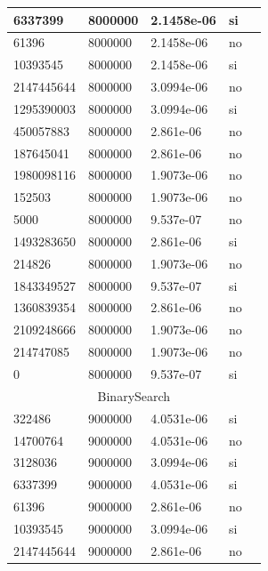 \documentclass[12pt, fleqn]{article}                             %
\theoremstyle{break}                                            %
\begin{document}
\begin{longtable}{|m{5em}|m{5em}|m{10em}|m{5em}|@{}m{0pt}@{}}
            6337399& 8000000  & 2.1458e-06 & si &\\[1em]    \hline
            61396& 8000000  & 2.1458e-06 & no &\\[1em]    \hline
            10393545& 8000000  & 2.1458e-06 & si &\\[1em]    \hline
            2147445644& 8000000  & 3.0994e-06 & no &\\[1em]    \hline
            1295390003& 8000000  & 3.0994e-06 & si &\\[1em]    \hline
            450057883& 8000000  & 2.861e-06 & no &\\[1em]    \hline
            187645041& 8000000  & 2.861e-06 & no &\\[1em]    \hline
            1980098116& 8000000  & 1.9073e-06 & no &\\[1em]    \hline
            152503& 8000000  & 1.9073e-06 & no &\\[1em]    \hline
            5000& 8000000  & 9.537e-07 & no &\\[1em]    \hline
            1493283650& 8000000  & 2.861e-06 & si &\\[1em]    \hline
            214826& 8000000  & 1.9073e-06 & no &\\[1em]    \hline
            1843349527& 8000000  & 9.537e-07 & si &\\[1em]    \hline
            1360839354& 8000000  & 2.861e-06 & no &\\[1em]    \hline
            2109248666& 8000000  & 1.9073e-06 & no &\\[1em]    \hline
            214747085& 8000000  & 1.9073e-06 & no &\\[1em]    \hline
            0& 8000000  & 9.537e-07 & si &\\[1em]    \hline
            \multicolumn{5}{|c|}{BinarySearch}   \\          \hline
            322486& 9000000  & 4.0531e-06 & si &\\[1em]    \hline
            14700764& 9000000  & 4.0531e-06 & no &\\[1em]    \hline
            3128036& 9000000  & 3.0994e-06 & si &\\[1em]    \hline
            6337399& 9000000  & 4.0531e-06 & si &\\[1em]    \hline
            61396& 9000000  & 2.861e-06 & no &\\[1em]    \hline
            10393545& 9000000  & 3.0994e-06 & si &\\[1em]    \hline
            2147445644& 9000000  & 2.861e-06 & no &\\[1em]    \hline

\end{longtable}
\end{document}
